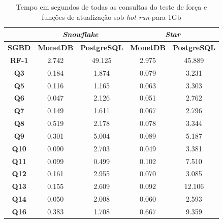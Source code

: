 \begin{table}[t]
        \centering
        \caption{Tempo em segundos de todas as consultas do teste de força e funções de atualização sob \textit{hot run} para 1Gb}
        \label{tab:queries_hot_1}
        \begin{tabular}{|c|c|c|c|c|}
        \hline
        & \multicolumn{2}{c|}{\textit{\textbf{Snowflake}}} & \multicolumn{2}{c|}{\textit{\textbf{Star}}} \\ \hline
        \textbf{SGBD}  & \textbf{MonetDB}      & \textbf{PostgreSQL}      & \textbf{MonetDB}    & \textbf{PostgreSQL}   \\ \hline
        \textbf{RF-1}  & 2.742             & 49.125              & 2.975            & 45.889              \\ \hline
        \textbf{Q3}    & 0.184             & 1.874               & 0.079            & 3.231               \\ \hline
        \textbf{Q5}    & 0.116             & 1.165               & 0.063            & 3.303               \\ \hline
        \textbf{Q6}    & 0.047             & 2.126               & 0.051            & 2.762               \\ \hline
        \textbf{Q7}    & 0.149             & 1.611               & 0.067            & 2.796               \\ \hline
        \textbf{Q8}    & 0.519             & 2.178               & 0.078            & 3.344               \\ \hline
        \textbf{Q9}    & 0.301             & 5.004               & 0.089            & 5.187               \\ \hline
        \textbf{Q10}   & 0.090             & 2.703               & 0.049            & 3.381               \\ \hline
        \textbf{Q11}   & 0.099             & 0.499               & 0.102            & 7.510               \\ \hline
        \textbf{Q12}   & 0.161             & 2.955               & 0.070            & 3.085               \\ \hline
        \textbf{Q13}   & 0.155             & 2.609               & 0.092            & 12.106              \\ \hline
        \textbf{Q14}   & 0.050             & 2.008               & 0.060            & 2.593               \\ \hline
        \textbf{Q16}   & 0.383             & 1.708               & 0.667            & 9.359               \\ \hline

\end{tabular}
\end{table}
